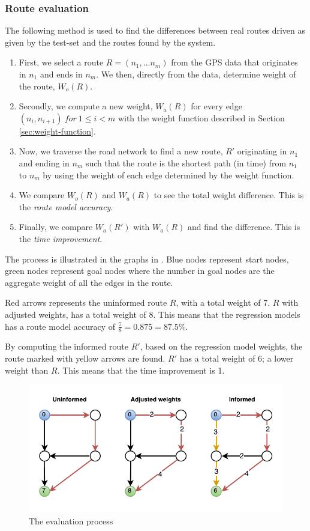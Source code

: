 \subsubsection{Route evaluation}
The following method is used to find the differences between real routes driven as given by the test-set and the routes found by the system.
\begin{enumerate}
\item First, we select a route $R=(n_1,...n_m)$ from the GPS data that originates in $n_1$ and ends in $n_m$. We then, directly from the data, determine weight of the route, $W_o(R)$.
\item Secondly, we compute a new weight, $W_{a}(R)$ for every edge $(n_i,n_{i+1}) \  for \  1 \leq i < m$ with the weight function described in Section \ref{sec:weight-function}.
\item Now, we traverse the road network to find a new route, $R'$ originating in $n_1$ and ending in $n_m$ such that the route is the shortest path (in time) from $n_1$ to $n_m$ by using the weight of each edge determined by the weight function.
\item We compare $W_o(R)$ and $W_a(R)$ to see the total weight difference. This is the \emph{route model accuracy}.
\item Finally, we compare $W_a(R')$ with $W_a(R)$ and find the difference. This is the \emph{time improvement}.
\end{enumerate}
The process is illustrated in the graphs in . Blue nodes represent start nodes, green nodes represent goal nodes where the number in goal nodes are the aggregate weight of all the edges in the route. 

Red arrows represents the uninformed route $R$, with a total weight of 7. $R$ with adjusted weights, has a total weight of 8. This means that the regression models has a route model accuracy of $\frac{7}{8}=0.875=87.5\%$. 

By computing the informed route $R'$, based on the regression model weights, the route marked with yellow arrows are found. $R'$ has a total weight of 6; a lower weight than $R$. This means that the time improvement is 1.

\begin{figure}
\centering
\includegraphics[width=\textwidth]{figures/eval.pdf}
\caption{The evaluation process}
\label{fig:eval}
\end{figure}

